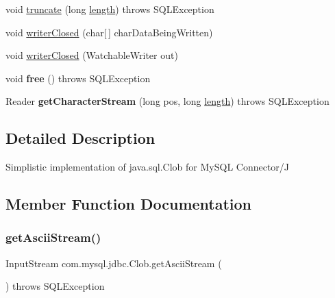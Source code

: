 \begin{DoxyCompactItemize}
\item 
void \mbox{\hyperlink{classcom_1_1mysql_1_1jdbc_1_1_clob_a7d245e2b037ea85293c17e6403696f6f}{truncate}} (long \mbox{\hyperlink{classcom_1_1mysql_1_1jdbc_1_1_clob_ac337421e5371c5ecafcffbfd75103a5d}{length}})  throws S\+Q\+L\+Exception 
\item 
void \mbox{\hyperlink{classcom_1_1mysql_1_1jdbc_1_1_clob_a1805514024772c139eb896eca9a73b1c}{writer\+Closed}} (char\mbox{[}$\,$\mbox{]} char\+Data\+Being\+Written)
\item 
void \mbox{\hyperlink{classcom_1_1mysql_1_1jdbc_1_1_clob_a526c6cf89df8662be452f2358117a20a}{writer\+Closed}} (Watchable\+Writer out)
\item 
\mbox{\label{classcom_1_1mysql_1_1jdbc_1_1_clob_aad969190533a88e73d0101da9bba8f24}} 
void {\bfseries free} ()  throws S\+Q\+L\+Exception 
\item 
\mbox{\label{classcom_1_1mysql_1_1jdbc_1_1_clob_a00b45a711ef9468a1af24383996d1cb9}} 
Reader {\bfseries get\+Character\+Stream} (long pos, long \mbox{\hyperlink{classcom_1_1mysql_1_1jdbc_1_1_clob_ac337421e5371c5ecafcffbfd75103a5d}{length}})  throws S\+Q\+L\+Exception 
\end{DoxyCompactItemize}


\subsection{Detailed Description}
Simplistic implementation of java.\+sql.\+Clob for My\+S\+QL Connector/J 

\subsection{Member Function Documentation}
\mbox{\label{classcom_1_1mysql_1_1jdbc_1_1_clob_a26b535e118f453c6524ef55fa26a2218}} 
\subsubsection{\texorpdfstring{get\+Ascii\+Stream()}{getAsciiStream()}}
{\footnotesize\ttfamily Input\+Stream com.\+mysql.\+jdbc.\+Clob.\+get\+Ascii\+Stream (\begin{DoxyParamCaption}{ }\end{DoxyParamCaption}) throws S\+Q\+L\+Exception}

